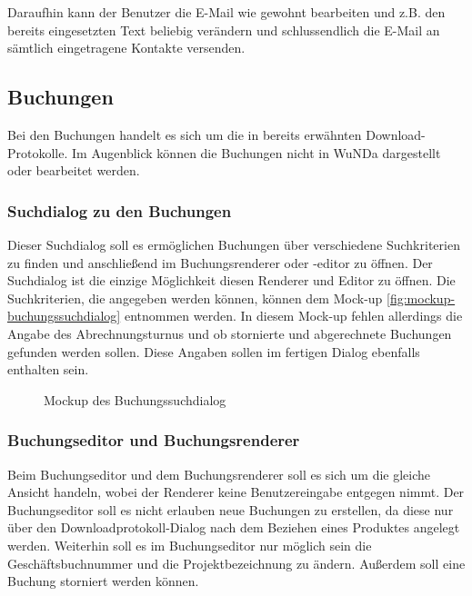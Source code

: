 Daraufhin kann der Benutzer die E-Mail wie gewohnt bearbeiten und z.B. den bereits eingesetzten Text beliebig verändern und schlussendlich die E-Mail an sämtlich eingetragene Kontakte versenden.


\subsection{Buchungen}
Bei den Buchungen handelt es sich um die in  bereits erwähnten Download-Protokolle. Im Augenblick können die Buchungen nicht in \ac{WuNDa} dargestellt oder bearbeitet werden.

\subsubsection{Suchdialog zu den Buchungen}
Dieser Suchdialog soll es ermöglichen Buchungen über verschiedene Suchkriterien zu finden und anschließend im Buchungsrenderer oder -editor zu öffnen.
Der Suchdialog ist die einzige Möglichkeit diesen Renderer und Editor zu öffnen. Die Suchkriterien, die angegeben werden können, können dem Mock-up \vref{fig:mockup-buchungssuchdialog} entnommen werden. In diesem Mock-up fehlen allerdings die Angabe des Abrechnungsturnus und ob stornierte und abgerechnete Buchungen gefunden werden sollen.
Diese Angaben sollen im fertigen Dialog ebenfalls enthalten sein.  
\begin{figure}[htbp]
	\centering
	\caption{Mockup des Buchungssuchdialog}
	\label{fig:mockup-buchungssuchdialog}
\end{figure}

\subsubsection{Buchungseditor und Buchungsrenderer}
Beim Buchungseditor und dem Buchungsrenderer soll es sich um die gleiche Ansicht handeln, wobei der Renderer keine Benutzereingabe entgegen nimmt.
Der Buchungseditor soll es nicht erlauben neue Buchungen zu erstellen, da diese nur über den Downloadprotokoll-Dialog nach dem Beziehen eines Produktes angelegt werden.
Weiterhin soll es im Buchungseditor nur möglich sein die Geschäftsbuchnummer und die Projektbezeichnung zu ändern.
Außerdem soll eine Buchung storniert werden können.

